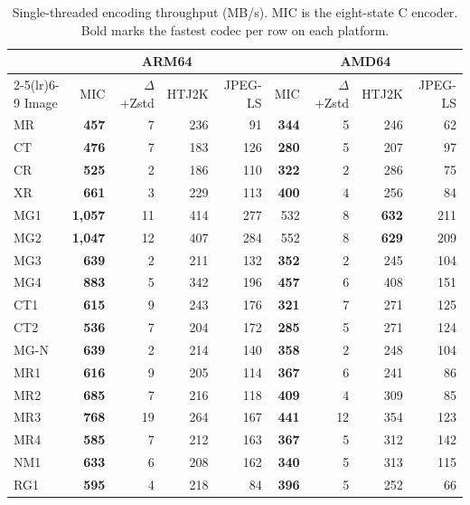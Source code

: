\documentclass[journal]{IEEEtran}
\begin{document}
\begin{table}[htbp]
\centering
\caption{Single-threaded encoding throughput (MB/s). MIC is the
eight-state C encoder. Bold marks the fastest codec per row on each
platform.}
\label{tab:enc}
\scriptsize
\begin{tabular}{l|rrrr|rrrr}
\toprule
 & \multicolumn{4}{c|}{ARM64} & \multicolumn{4}{c}{AMD64} \\
\cmidrule(lr){2-5}\cmidrule(lr){6-9}
Image & MIC & $\Delta$+Zstd & HTJ2K & JPEG-LS & MIC & $\Delta$+Zstd & HTJ2K & JPEG-LS \\
\midrule
MR             & \textbf{457} & 7 & 236 & 91 & \textbf{344} & 5 & 246 & 62 \\
CT             & \textbf{476} & 7 & 183 & 126 & \textbf{280} & 5 & 207 & 97 \\
CR             & \textbf{525} & 2 & 186 & 110 & \textbf{322} & 2 & 286 & 75 \\
XR             & \textbf{661} & 3 & 229 & 113 & \textbf{400} & 4 & 256 & 84 \\
MG1            & \textbf{1{,}057} & 11 & 414 & 277 & 532 & 8 & \textbf{632} & 211 \\
MG2            & \textbf{1{,}047} & 12 & 407 & 284 & 552 & 8 & \textbf{629} & 209 \\
MG3            & \textbf{639} & 2 & 211 & 132 & \textbf{352} & 2 & 245 & 104 \\
MG4            & \textbf{883} & 5 & 342 & 196 & \textbf{457} & 6 & 408 & 151 \\
CT1            & \textbf{615} & 9 & 243 & 176 & \textbf{321} & 7 & 271 & 125 \\
CT2            & \textbf{536} & 7 & 204 & 172 & \textbf{285} & 5 & 271 & 124 \\
MG-N           & \textbf{639} & 2 & 214 & 140 & \textbf{358} & 2 & 248 & 104 \\
MR1            & \textbf{616} & 9 & 205 & 114 & \textbf{367} & 6 & 241 & 86 \\
MR2            & \textbf{685} & 7 & 216 & 118 & \textbf{409} & 4 & 309 & 85 \\
MR3            & \textbf{768} & 19 & 264 & 167 & \textbf{441} & 12 & 354 & 123 \\
MR4            & \textbf{585} & 7 & 212 & 163 & \textbf{367} & 5 & 312 & 142 \\
NM1            & \textbf{633} & 6 & 208 & 162 & \textbf{340} & 5 & 313 & 115 \\
RG1            & \textbf{595} & 4 & 218 & 84 & \textbf{396} & 5 & 252 & 66 \\

\end{tabular}
\end{table}
\end{document}
